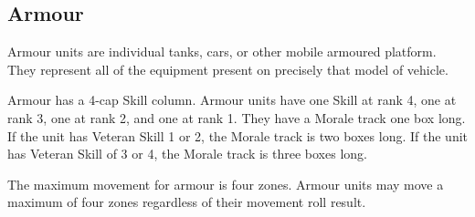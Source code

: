 \subsection{Armour}
\label{sec:armour}

Armour units are individual tanks, cars, or other mobile armoured platform. They represent all of the equipment present on precisely that model of vehicle.

Armour has a 4-cap Skill column. Armour units have one Skill at rank 4, one at rank 3, one at rank 2, and one at rank 1. They have a Morale track one box long. If the unit has Veteran Skill 1 or 2, the Morale track is two boxes long. If the unit has Veteran Skill of 3 or 4, the Morale track is three boxes long.

The maximum movement for armour is four zones. Armour units may move a maximum of four zones regardless of their movement roll result.


